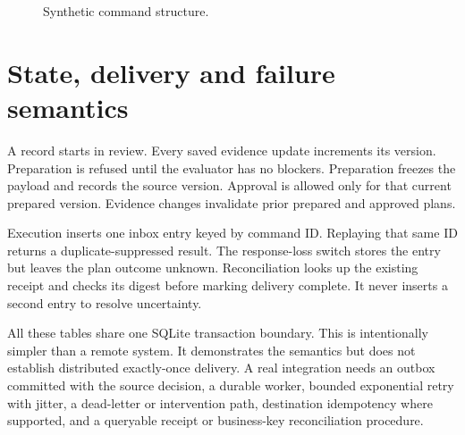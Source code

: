 \documentclass[11pt,letterpaper]{article}
\begin{document}
\begin{figure}[htbp]
{%

}
\caption{Synthetic command structure.}
\end{figure}

\section{State, delivery and failure semantics}
A record starts in review. Every saved evidence update increments its version. Preparation is refused until the evaluator has no blockers. Preparation freezes the payload and records the source version. Approval is allowed only for that current prepared version. Evidence changes invalidate prior prepared and approved plans.

Execution inserts one inbox entry keyed by command ID. Replaying that same ID returns a duplicate-suppressed result. The response-loss switch stores the entry but leaves the plan outcome unknown. Reconciliation looks up the existing receipt and checks its digest before marking delivery complete. It never inserts a second entry to resolve uncertainty.

All these tables share one SQLite transaction boundary. This is intentionally simpler than a remote system. It demonstrates the semantics but does not establish distributed exactly-once delivery. A real integration needs an outbox committed with the source decision, a durable worker, bounded exponential retry with jitter, a dead-letter or intervention path, destination idempotency where supported, and a queryable receipt or business-key reconciliation procedure.
\end{document}
